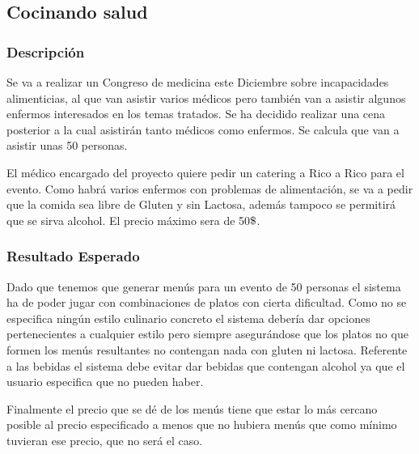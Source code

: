 \documentclass{article}
\newcommand{\dollar}{\mbox{\textdollar}}
\begin{document}
\subsection{Cocinando salud}
\subsubsection{Descripción}
Se va a realizar un Congreso de medicina este Diciembre sobre incapacidades alimenticias, al que van asistir varios médicos pero también van a asistir algunos enfermos interesados en los temas tratados. Se ha decidido realizar una cena posterior a la cual asistirán tanto médicos como enfermos. Se calcula que van a asistir unas 50 personas.
\par
El médico encargado del proyecto quiere pedir un catering a Rico a Rico para el evento. Como habrá varios enfermos con problemas de alimentación, se va a pedir que la comida sea libre de Gluten y sin Lactosa, además tampoco se permitirá que se sirva alcohol. El precio máximo sera de 50$\dollar$.

\subsubsection{Resultado Esperado}
Dado que tenemos que generar menús para un evento de 50 personas el sistema ha de poder jugar con combinaciones de platos con cierta dificultad. Como no se especifica ningún estilo culinario concreto el sistema debería dar opciones pertenecientes a cualquier estilo pero siempre asegurándose que los platos no que formen los menús resultantes no contengan nada con gluten ni lactosa. Referente a las bebidas el sistema debe evitar dar bebidas que contengan alcohol ya que el usuario especifica que no pueden haber.
\par
Finalmente el precio que se dé de los menús tiene que estar lo más cercano posible al precio especificado a menos que no hubiera menús que como mínimo tuvieran ese precio, que no será el caso.
\end{document}
